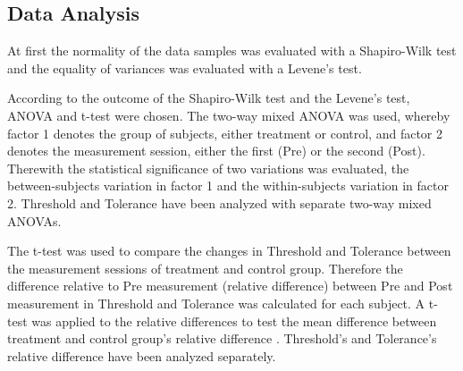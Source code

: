 \subsection{Data Analysis}

At first the normality of the data samples was evaluated with a Shapiro-Wilk test and the equality of variances was evaluated with a Levene's test. 

According to the outcome of the Shapiro-Wilk test and the Levene’s test, ANOVA and t-test were chosen. The two-way mixed ANOVA was used, whereby factor 1 denotes the group of subjects, either treatment or control, and factor 2 denotes the measurement session, either the first (Pre) or the second (Post). Therewith the statistical significance of two variations was evaluated, the between-subjects variation in factor 1 and the within-subjects variation in factor 2. \cite{Mooi2018} Threshold and Tolerance have been analyzed with separate two-way mixed ANOVAs.

The t-test was used to compare the changes in Threshold and Tolerance between the measurement sessions of treatment and control group. Therefore the difference relative to Pre measurement (relative difference) between Pre and Post measurement in Threshold and Tolerance was calculated for each subject. A t-test was applied to the relative differences to test the mean difference between treatment and control group’s relative difference \cite{Mooi2018}. Threshold's and Tolerance's relative difference have been analyzed separately.


